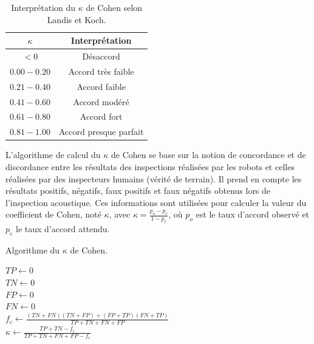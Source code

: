 \documentclass[francais,RandD]{rapportPFE}
\begin{document}
			\begin{table}[h!]
				\centering
				\begin{tabular}{|c|c|}
					\hline
					$\kappa$ & Interprétation \\
					\hline
					$< 0$ & Désaccord \\
					\hline
					$0.00 - 0.20$ & Accord très faible \\
					\hline
					$0.21 - 0.40$ & Accord faible \\
					\hline
					$0.41 - 0.60$ & Accord modéré \\
					\hline
					$0.61 - 0.80$ & Accord fort \\
					\hline
					$0.81 - 1.00$ & Accord presque parfait \\
					\hline
				\end{tabular}
				\caption{Interprétation du $\kappa$ de Cohen selon Landis et Koch.}
				\label{tab:Kappa_Cohen}
			\end{table}

			L'algorithme de calcul du $\kappa$ de Cohen se base sur la notion de concordance et de discordance entre les résultats des inspections réalisées par les robots et celles réalisées par des inspecteurs humains (vérité de terrain).
			Il prend en compte les résultats positifs, négatifs, faux positifs et faux négatifs obtenus lors de l'inspection acoustique.
			Ces informations sont utilisées pour calculer la valeur du coefficient de Cohen, noté $\kappa$, avec $\kappa = \frac{p_o - p_e}{1 - p_e}$, où $p_o$ est le taux d'accord observé et $p_e$ le taux d'accord attendu.

			\begin{algorithm}[h!]
				\caption{Algorithme du $\kappa$ de Cohen.}
				\label{alg:Cohen_Kappa}
				\KwResult{$\kappa \in [0, 1]$}
				$TP \gets 0$ \\
				$TN \gets 0$ \\
				$FP \gets 0$ \\
				$FN \gets 0$ \\
				$f_c \gets \frac{(TN + FN) (TN + FP) + (FP + TP) (FN + TP)}{TP + TN + FN +FP}$ \\
				$\kappa \gets \frac{TP + TN - f_c}{TP + TN + FN + FP - f_c}$
			\end{algorithm}
\end{document}
